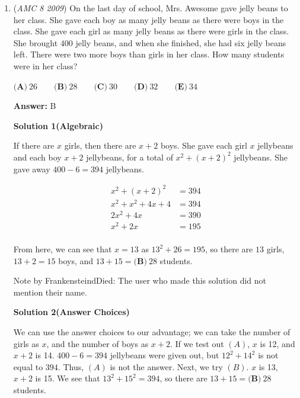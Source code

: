\begin{enumerate}
 Case 3 : The number has $3$ digits. Using similar logic to Case 2, we have 8*9*9 choices for the third number.

 We add the cases up getting $648+72+8$ which gives us $\framebox{(D) 728}$ numbers total.

 


	\item (\textit{AMC 8 2009}) On the last day of school, Mrs. Awesome gave jelly beans to her class. She gave each boy as many jelly beans as there were boys in the class. She gave each girl as many jelly beans as there were girls in the class. She brought $400$ jelly beans, and when she finished, she had six jelly beans left. There were two more boys than girls in her class. How many students were in her class?   


 $\textbf{(A)}\ 26\qquad\textbf{(B)}\ 28\qquad\textbf{(C)}\ 30\qquad\textbf{(D)}\ 32\qquad\textbf{(E)}\ 34$

 \textbf{Answer: }B



\textbf{Solution 1(Algebraic)}

If there are $x$ girls, then there are $x+2$ boys. She gave each girl $x$ jellybeans and each boy $x+2$ jellybeans, for a total of $x^2 + (x+2)^2$ jellybeans. She gave away $400-6=394$ jellybeans.

 
 \begin{align*} x^2+(x+2)^2 &= 394\\ x^2+x^2+4x+4 &= 394\\ 2x^2 + 4x &= 390\\ x^2 + 2x &= 195\\ \end{align*}


 From here, we can see that $x = 13$ as  $13^2 + 26 = 195$, so there are $13$ girls, $13+2=15$ boys, and $13+15=\boxed{\textbf{(B)}\ 28}$ students.

 
Note by FrankensteindDied: The user who made this solution did not mention their name.

 



\textbf{Solution 2(Answer Choices)}

We can use the answer choices to our advantage; we can take the number of girls as $x$, and the number of boys as $x+2$. If we test out $(A)$, $x$ is 12, and $x+2$ is 14. $400-6=394$ jellybeans were given out, but $12^2+14^2$ is not equal to $394$. Thus, $(A)$ is not the answer. Next, we try $(B)$. $x$ is 13, $x+2$ is 15. We see that $13^2+15^2=394$, so there are $13+15=\boxed{\textbf{(B)}\ 28}$ students.


\end{enumerate}
